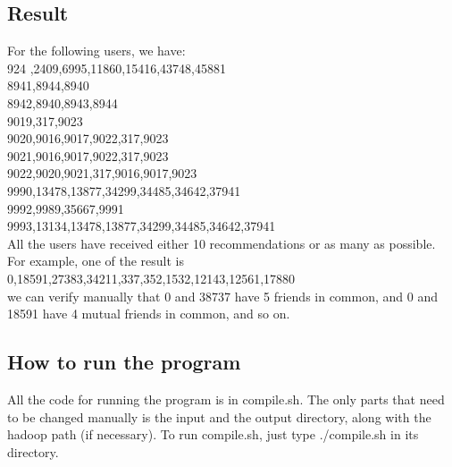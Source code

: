 \documentclass[11pt]{article}
\begin{document}
\begin{justifying}
\subsection{Result}
For the following users, we have:\\
924 \space \space \space {},2409,6995,11860,15416,43748,45881\\
8941\space \space \space {},8944,8940\\
8942\space \space \space {},8940,8943,8944\\
9019\space \space \space {},317,9023\\
9020\space \space \space {},9016,9017,9022,317,9023\\
9021\space \space \space {},9016,9017,9022,317,9023\\
9022\space \space \space {},9020,9021,317,9016,9017,9023\\
9990\space \space \space {},13478,13877,34299,34485,34642,37941\\
9992\space \space \space {},9989,35667,9991\\
9993\space \space \space {},13134,13478,13877,34299,34485,34642,37941\\
All the users have received either 10 recommendations or as many as possible. For example, one of the result is\\
0\space \space \space {},18591,27383,34211,337,352,1532,12143,12561,17880\\
we can verify manually that 0 and 38737 have 5 friends in common, and 0 and 18591 have
4 mutual friends in common, and so on.

\subsection{How to run the program}
All the code for running the program is in compile.sh. The only parts that need to be changed
manually is the input and the output directory, along with the hadoop path (if necessary). To
run compile.sh, just type ./compile.sh in its directory.


\end{justifying}
\end{document}
